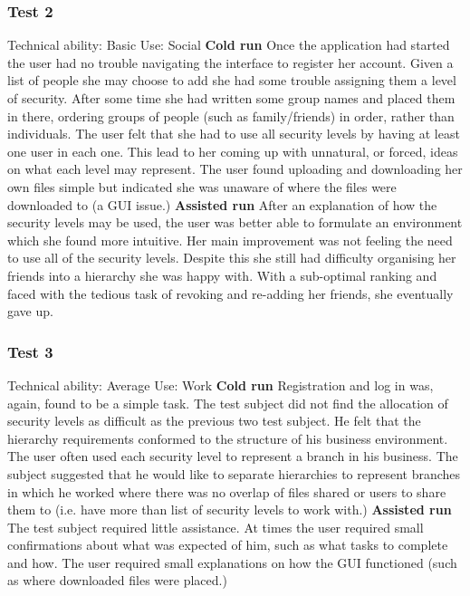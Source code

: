 \documentclass[12pt, titlepage]{article}
\begin{document}
\subsubsection{Test 2}
Technical ability: Basic
\newline Use: Social
\newline
\newline \textbf{Cold run}
\newline Once the application had started the user had no trouble navigating the interface to register her account. Given a list of people she may choose to add she had some trouble assigning them a level of security. After some time she had written some group names and placed them in there, ordering groups of people (such as family/friends) in order, rather than individuals. The user felt that she had to use all security levels by having at least one user in each one. This lead to her coming up with unnatural, or forced, ideas on what each level may represent.
\newline \indent The user found uploading and downloading her own files simple but indicated she was unaware of where the files were downloaded to (a GUI issue.)
\newline
\newline \textbf{Assisted run}
\newline After an explanation of how the security levels may be used, the user was better able to formulate an environment which she found more intuitive. Her main improvement was not feeling the need to use all of the security levels. Despite this she still had difficulty organising her friends into a hierarchy she was happy with. With a sub-optimal ranking and faced with the tedious task of revoking and re-adding her friends, she eventually gave up.

\subsubsection{Test 3}
Technical ability: Average
\newline Use: Work
\newline
\newline \textbf{Cold run}
\newline Registration and log in was, again, found to be a simple task. The test subject did not find the allocation of security levels as difficult as the previous two test subject. He felt that the hierarchy requirements conformed to the structure of his business environment. The user often used each security level to represent a branch in his business. The subject suggested that he would like to separate hierarchies to represent branches in which he worked where there was no overlap of files shared or users to share them to (i.e. have more than list of security levels to work with.)
\newline \textbf{Assisted run}
\newline The test subject required little assistance. At times the user required small confirmations about what was expected of him, such as what tasks to complete and how. The user required small explanations on how the GUI functioned (such as where downloaded files were placed.) 
\end{document}
